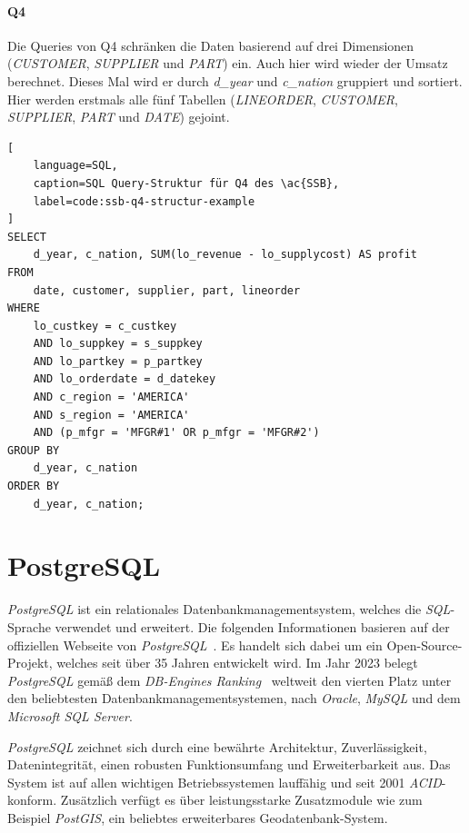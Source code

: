 \paragraph{Q4}\label{sec:ssb-q4}
Die Queries von Q4 schränken die Daten basierend auf drei Dimensionen\\ (\emph{CUSTOMER}, \emph{SUPPLIER} und \emph{PART}) ein.
Auch hier wird wieder der Umsatz berechnet.
Dieses Mal wird er durch \emph{d\_year} und \emph{c\_nation} gruppiert und sortiert.
Hier werden erstmals alle fünf Tabellen (\emph{LINEORDER}, \emph{CUSTOMER}, \emph{SUPPLIER}, \emph{PART} und \emph{DATE}) gejoint.

\begin{lstlisting}[
    language=SQL,
    caption=SQL Query-Struktur für Q4 des \ac{SSB},
    label=code:ssb-q4-structur-example
]
SELECT 
    d_year, c_nation, SUM(lo_revenue - lo_supplycost) AS profit
FROM 
    date, customer, supplier, part, lineorder
WHERE 
    lo_custkey = c_custkey
    AND lo_suppkey = s_suppkey
    AND lo_partkey = p_partkey
    AND lo_orderdate = d_datekey
    AND c_region = 'AMERICA'
    AND s_region = 'AMERICA'
    AND (p_mfgr = 'MFGR#1' OR p_mfgr = 'MFGR#2')
GROUP BY 
    d_year, c_nation
ORDER BY 
    d_year, c_nation;

\end{lstlisting}

\section{PostgreSQL}
\emph{PostgreSQL} ist ein relationales Datenbankmanagementsystem, welches die \emph{SQL}-Spra\-che ver\-wen\-det und erweitert. Die folgenden Informationen basieren auf der offiziellen Webseite von \emph{PostgreSQL}~\cite{the_postgresql_global_development_group_postgresql_nodate}. Es handelt sich dabei um ein Open-Source-Projekt, welches seit über 35 Jahren entwickelt wird. Im Jahr 2023 belegt \emph{PostgreSQL} gemäß dem \emph{DB-Engines Ranking}~\cite{db-engines_most_2023} weltweit den vierten Platz unter den beliebtesten Datenbankmanagementsystemen, nach \emph{Oracle}, \emph{MySQL} und dem \emph{Microsoft SQL Server}.

\emph{PostgreSQL} zeichnet sich durch eine bewährte Architektur, Zuverlässigkeit, Datenintegrität, einen robusten Funktionsumfang und Erweiterbarkeit aus. Das System ist auf allen wichtigen Betriebssystemen lauffähig und seit 2001 \emph{ACID}-konform.  Zusätzlich verfügt es über leistungsstarke Zusatzmodule wie zum Beispiel \emph{PostGIS}, ein beliebtes erweiterbares Geodatenbank-System.

